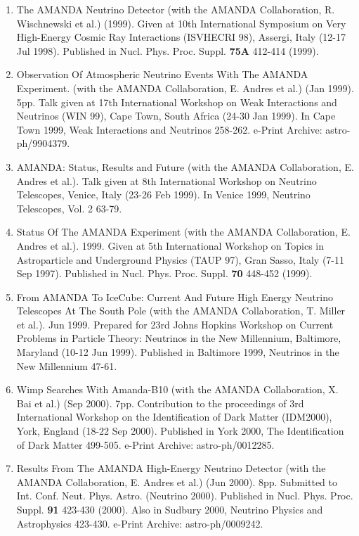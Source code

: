 \begin{enumerate}
\item The AMANDA Neutrino Detector (with the AMANDA Collaboration, R. Wischnewski et al.) (1999). Given at 10th International Symposium on Very High-Energy Cosmic Ray Interactions (ISVHECRI 98), Assergi, Italy (12-17 Jul 1998).  Published in Nucl. Phys. Proc. Suppl. {\bf 75A} 412-414 (1999).

\item Observation Of Atmospheric Neutrino Events With The AMANDA Experiment. (with the AMANDA Collaboration, E. Andres et al.) (Jan 1999). 5pp.  Talk given at 17th International Workshop on Weak Interactions and Neutrinos (WIN 99), Cape Town, South Africa (24-30 Jan 1999). In Cape Town 1999, Weak Interactions and Neutrinos 258-262.  e-Print Archive: astro-ph/9904379.

\item AMANDA: Status, Results and Future (with the AMANDA Collaboration, E. Andres et al.).  Talk given at 8th International Workshop on Neutrino Telescopes, Venice, Italy (23-26 Feb 1999).  In Venice 1999, Neutrino Telescopes, Vol. 2 63-79.

\item Status Of The AMANDA Experiment (with the AMANDA Collaboration, E. Andres et al.). 1999. Given at 5th International Workshop on Topics in Astroparticle and Underground Physics (TAUP 97), Gran Sasso, Italy (7-11 Sep 1997).  Published in Nucl. Phys. Proc. Suppl. {\bf 70} 448-452 (1999).

\item From AMANDA To IceCube: Current And Future High Energy Neutrino Telescopes At The South Pole (with the AMANDA Collaboration, T. Miller et al.). Jun 1999. Prepared for 23rd Johns Hopkins Workshop on Current Problems in Particle Theory: Neutrinos in the New Millennium, Baltimore, Maryland (10-12 Jun 1999).  Published in Baltimore 1999, Neutrinos in the New Millennium 47-61. 

\item Wimp Searches With Amanda-B10 (with the AMANDA Collaboration, X. Bai et al.) (Sep 2000). 7pp. Contribution to the proceedings of 3rd International Workshop on the Identification of Dark Matter (IDM2000), York, England (18-22 Sep 2000).  Published in York 2000, The Identification of Dark Matter 499-505. e-Print Archive: astro-ph/0012285. 

\item Results From The AMANDA High-Energy Neutrino Detector (with the AMANDA Collaboration, E. Andres et al.) (Jun 2000). 8pp. Submitted to Int. Conf. Neut. Phys. Astro. (Neutrino 2000).  Published in Nucl. Phys. Proc. Suppl. {\bf 91} 423-430 (2000). Also in Sudbury 2000, Neutrino Physics and Astrophysics 423-430. e-Print Archive: astro-ph/0009242.


\end{enumerate}
